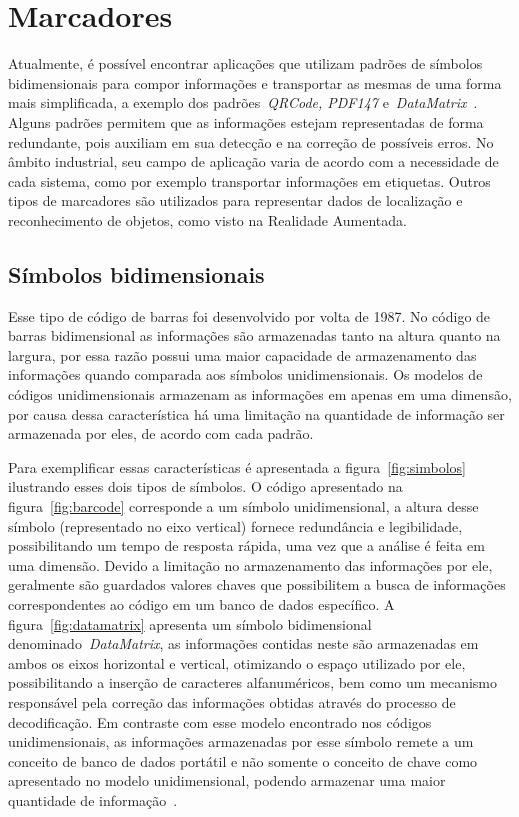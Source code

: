 \section{Marcadores}
\label{sec:marcadores}

	Atualmente, é possível encontrar aplicações que utilizam padrões de símbolos bidimensionais para
	compor informações e transportar as mesmas de uma forma mais simplificada, a exemplo dos
	padrões~\textit{QRCode, PDF147} e~\textit{DataMatrix}~\cite{gao}. Alguns padrões permitem que as
	informações estejam representadas de forma redundante, pois auxiliam em sua detecção e na correção
	de possíveis erros. No âmbito industrial, seu campo de aplicação varia de acordo com a necessidade
	de cada sistema, como por exemplo transportar informações em etiquetas. Outros tipos de marcadores
	são utilizados para representar dados de localização e reconhecimento de objetos, como visto na
	Realidade Aumentada.
	
\subsection{Símbolos bidimensionais}
	\label{sec:simbolos_bidimensionais}
	
	Esse tipo de código de barras foi desenvolvido por volta de 1987. No código de barras bidimensional
	as informações são armazenadas tanto na altura quanto na largura, por essa razão possui uma maior
	capacidade de armazenamento das informações quando comparada aos símbolos unidimensionais. Os
	modelos de códigos unidimensionais armazenam as informações em apenas em uma dimensão, por
	causa dessa característica há uma limitação na quantidade de informação ser armazenada
	por eles, de acordo com cada padrão.  
	
	Para exemplificar essas características é apresentada a figura~\ref{fig:simbolos} ilustrando
	esses dois tipos de símbolos. O código apresentado na figura~\ref{fig:barcode} corresponde a um
	símbolo unidimensional, a altura desse símbolo (representado no eixo vertical) fornece
	redundância e legibilidade, possibilitando um tempo de resposta rápida, uma vez que a análise é
	feita em uma dimensão. Devido a limitação no armazenamento das informações por ele, geralmente são
	guardados valores chaves que possibilitem a busca de informações correspondentes ao código em um
	banco de dados específico. A figura~\ref{fig:datamatrix} apresenta um símbolo bidimensional
	denominado~\textit{DataMatrix}, as informações contidas neste são armazenadas em ambos os eixos
	horizontal e vertical, otimizando o espaço utilizado por ele, possibilitando a inserção de
	caracteres alfanuméricos, bem como um mecanismo responsável pela correção das informações obtidas
	através do processo de decodificação. Em contraste com esse modelo encontrado nos códigos
	unidimensionais, as informações armazenadas por esse símbolo remete a um conceito de banco de dados
	portátil e não somente o conceito de chave como apresentado no modelo unidimensional, podendo 
	armazenar uma maior quantidade de informação~\cite{gao}.
	
